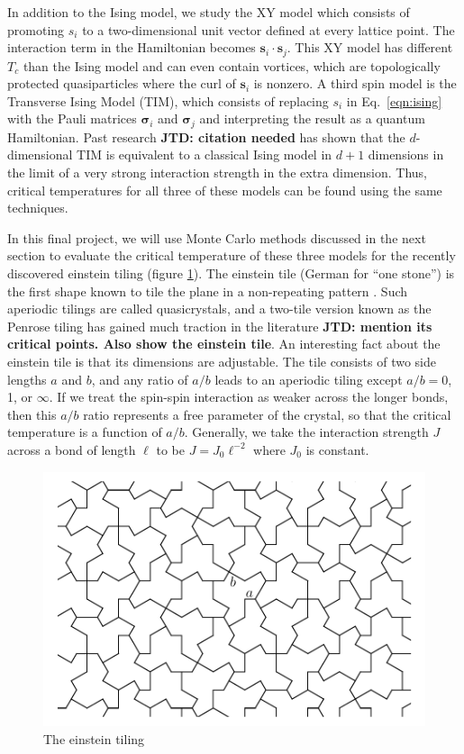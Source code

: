 \documentclass[amsmath,amssymb,aps,twocolumn]{revtex4-2}
\newcommand{\jtd}[1]{{\color{red}\textbf{JTD: #1}}}
\begin{document}
In addition to the Ising model, we study the XY model which consists of promoting $s_i$ to a two-dimensional unit vector defined at every lattice point. The interaction term in the Hamiltonian becomes $\bm s_i \cdot \bm s_j$. This XY model has different $T_c$ than the Ising model and can even contain vortices, which are topologically protected quasiparticles where the curl of $\bm s_i$ is nonzero. A third spin model is the Transverse Ising Model (TIM), which consists of replacing $s_i$ in Eq.~\ref{eqn:ising} with the Pauli matrices $\bm \sigma_i$ and $\bm \sigma_j$ and interpreting the result as a quantum Hamiltonian. Past research \jtd{citation needed} has shown that the $d$-dimensional TIM is equivalent to a classical Ising model in $d+1$ dimensions in the limit of a very strong interaction strength in the extra dimension. Thus, critical temperatures for all three of these models can be found using the same techniques.

In this final project, we will use Monte Carlo methods discussed in the next section to evaluate the critical temperature of these three models for the recently discovered einstein tiling (figure \ref{fig:einstein}). The einstein tile (German for ``one stone'') is the first shape known to tile the plane in a non-repeating pattern \cite{smith2023aperiodic}. Such aperiodic tilings are called quasicrystals, and a two-tile version known as the Penrose tiling has gained much traction in the literature \jtd{mention its critical points. Also show the einstein tile}. An interesting fact about the einstein tile is that its dimensions are adjustable. The tile consists of two side lengths $a$ and $b$, and any ratio of $a/b$ leads to an aperiodic tiling except $a/b=0$, 1, or $\infty$. If we treat the spin-spin interaction as weaker across the longer bonds, then this $a/b$ ratio represents a free parameter of the crystal, so that the critical temperature is a function of $a/b$. Generally, we take the interaction strength $J$ across a bond of length $\ell$ to be $J = J_0 \ell^{-2}$ where $J_0$ is constant.

\begin{figure}
  \centering
  \includegraphics[width=\linewidth]{../figs/einstein.pdf}
  \caption{The einstein tiling}
  \label{fig:einstein}
\end{figure}
\end{document}
